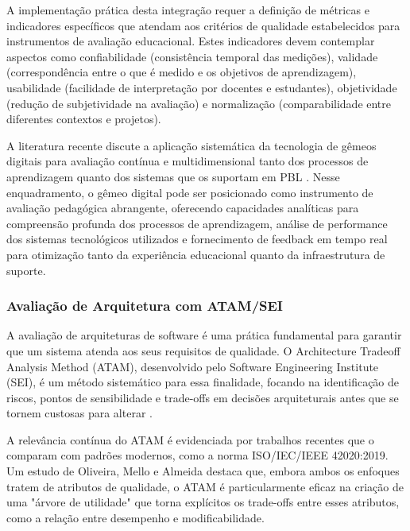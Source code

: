 \documentclass[12pt,a4paper]{article}
\begin{document}
A implementação prática desta integração requer a definição de métricas e
indicadores específicos que atendam aos critérios de qualidade estabelecidos
para instrumentos de avaliação educacional. Estes indicadores devem contemplar
aspectos como confiabilidade (consistência temporal das medições), validade
(correspondência entre o que é medido e os objetivos de aprendizagem),
usabilidade (facilidade de interpretação por docentes e estudantes),
objetividade (redução de subjetividade na avaliação) e normalização
(comparabilidade entre diferentes contextos e projetos).

A literatura recente discute a aplicação sistemática da tecnologia de gêmeos
digitais para avaliação contínua e multidimensional tanto dos processos de
aprendizagem quanto dos sistemas que os suportam em PBL \cite{barricelli2019}.
Nesse enquadramento, o gêmeo digital pode ser posicionado como instrumento de
avaliação pedagógica abrangente, oferecendo capacidades analíticas para
compreensão profunda dos processos de aprendizagem, análise de performance dos
sistemas tecnológicos utilizados e fornecimento de feedback em tempo real para
otimização tanto da experiência educacional quanto da infraestrutura de
suporte.







\subsubsection{Avaliação de Arquitetura com ATAM/SEI}

A avaliação de arquiteturas de software é uma prática fundamental para garantir que um sistema atenda aos seus requisitos de qualidade. O Architecture Tradeoff Analysis Method (ATAM), desenvolvido pelo Software Engineering Institute (SEI), é um método sistemático para essa finalidade, focando na identificação de riscos, pontos de sensibilidade e trade-offs em decisões arquiteturais antes que se tornem custosas para alterar \cite{kazman2000atam}.

A relevância contínua do ATAM é evidenciada por trabalhos recentes que o comparam com padrões modernos, como a norma ISO/IEC/IEEE 42020:2019. Um estudo de Oliveira, Mello e Almeida \cite{10022111} destaca que, embora ambos os enfoques tratem de atributos de qualidade, o ATAM é particularmente eficaz na criação de uma "árvore de utilidade" que torna explícitos os trade-offs entre esses atributos, como a relação entre desempenho e modificabilidade.
\end{document}
